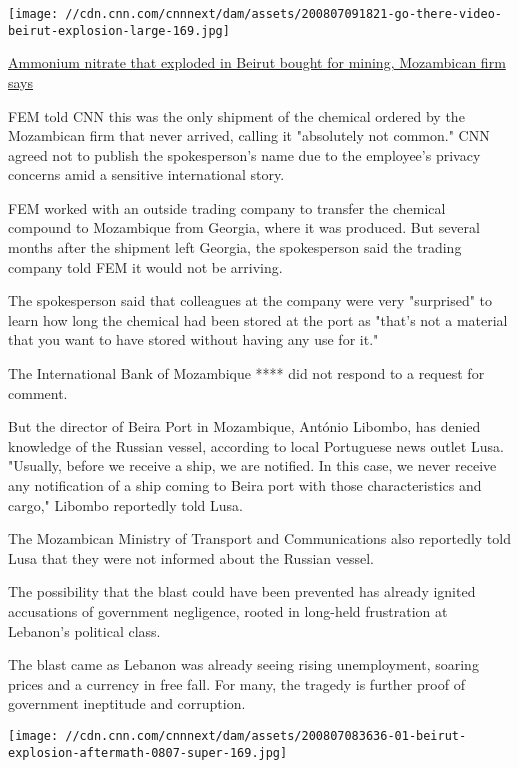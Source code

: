 \href{/2020/08/07/middleeast/beirut-lebanon-ammonium-nitrate-explosion/index.html}{}

\texttt{[image: //cdn.cnn.com/cnnnext/dam/assets/200807091821-go-there-video-beirut-explosion-large-169.jpg]}

\href{/2020/08/07/middleeast/beirut-lebanon-ammonium-nitrate-explosion/index.html}{Ammonium
nitrate that exploded in Beirut bought for mining, Mozambican firm says}

FEM told CNN this was the only shipment of the chemical ordered by the
Mozambican firm that never arrived, calling it "absolutely not common."
CNN agreed not to publish the spokesperson's name due to the employee's
privacy concerns amid a sensitive international story.

FEM worked with an outside trading company to transfer the chemical
compound to Mozambique from Georgia, where it was produced. But several
months after the shipment left Georgia, the spokesperson said the
trading company told FEM it would not be arriving.

The spokesperson said that colleagues at the company were very
"surprised" to learn how long the chemical had been stored at the port
as "that's not a material that you want to have stored without having
any use for it."

The International Bank of Mozambique **** did not respond to a request
for comment.

But the director of Beira Port in Mozambique, António Libombo, has
denied knowledge of the Russian vessel, according to local Portuguese
news outlet Lusa. "Usually, before we receive a ship, we are notified.
In this case, we never receive any notification of a ship coming to
Beira port with those characteristics and cargo," Libombo reportedly
told Lusa.

The Mozambican Ministry of Transport and Communications also reportedly
told Lusa that they were not informed about the Russian vessel.

The possibility that the blast could have been prevented has already
ignited accusations of government negligence, rooted in long-held
frustration at Lebanon's political class.

The blast came as Lebanon was already seeing rising unemployment,
soaring prices and a currency in free fall. For many, the tragedy is
further proof of government ineptitude and corruption.

\texttt{[image: //cdn.cnn.com/cnnnext/dam/assets/200807083636-01-beirut-explosion-aftermath-0807-super-169.jpg]}

